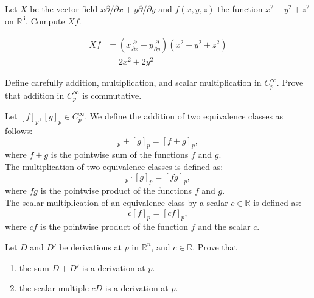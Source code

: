 \documentclass[en, oneside]{vivi}
\begin{document}
\begin{prob}
    Let $X$ be the vector field $x \partial / \partial x + y \partial / \partial y$ and $f(x, y, z)$ the function $x^2 + y^2 + z^2$ on $\mathbb{R}^3$. Compute $Xf$.
\end{prob}

\begin{sol}
    \begin{align*}
        Xf &= \left( x \frac{\partial}{\partial x} + y \frac{\partial}{\partial y} \right) (x^2 + y^2 + z^2)\\
        &= 2x^2 + 2y^2
    \end{align*}
\end{sol}

\begin{prob}
    Define carefully addition, multiplication, and scalar multiplication in $C_p^\infty$. Prove that addition in $C_p^\infty$ is commutative.
\end{prob}

\begin{sol}
    Let $[f]_p, [g]_p \in C_p^\infty$. We define the addition of two equivalence classes as follows:
    \begin{equation*}
        [f]_p + [g]_p = [f + g]_p,
    \end{equation*}
    where $f + g$ is the pointwise sum of the functions $f$ and $g$.\\
    The multiplication of two equivalence classes is defined as:
    \begin{equation*}
        [f]_p \cdot [g]_p = [fg]_p,
    \end{equation*}
    where $fg$ is the pointwise product of the functions $f$ and $g$.\\
    The scalar multiplication of an equivalence class by a scalar $c \in \mathbb{R}$ is defined as:
    \begin{equation*}
        c[f]_p = [cf]_p,
    \end{equation*}
    where $cf$ is the pointwise product of the function $f$ and the scalar $c$.
\end{sol}

\begin{prob}
    Let $D$ and $D'$ be derivations at $p$ in $\mathbb{R}^n$, and $c \in \mathbb{R}$. Prove that
    \begin{enumerate}[label=(\alph*)]
        \item the sum $D + D'$ is a derivation at $p$.
        \item the scalar multiple $cD$ is a derivation at $p$.
    \end{enumerate}
\end{prob}
\end{document}
